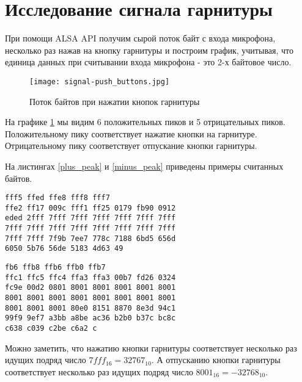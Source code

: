 \section{Исследование сигнала гарнитуры}

При помощи ALSA API получим сырой поток байт с входа микрофона, несколько раз нажав на кнопку гарнитуры и построим график, учитывая, что единица данных при считывании входа микрофона - это 2-х байтовое число. 

\begin{figure}[h]
  \centering
  \texttt{[image: signal-push\_buttons.jpg]}
  \caption{Поток байтов при нажатии кнопок гарнитуры}
  \label{image:signal}
\end{figure}

На графике \ref{image:signal} мы видим 6 положительных пиков и 5 отрицательных пиков. Положительному пику соответствует нажатие кнопки на гарнитуре. Отрицательному пику соответствует отпускание кнопки гарнитуры.

На листингах \ref{plus_peak} и \ref{minus_peak} приведены примеры считанных байтов.

\begin{lstlisting}[caption={Положительный пик (в шестнадцатиричной системе)},label=plus_peak]
fff5 ffed ffe8 fff8 fff7
ffe2 ff17 009c fff1 ff25 0179 fb90 0912
eded 2fff 7fff 7fff 7fff 7fff 7fff 7fff
7fff 7fff 7fff 7fff 7fff 7fff 7fff 7fff
7fff 7fff 7f9b 7ee7 778c 7188 6bd5 656d
6050 5b76 56de 5183 4d63 49
\end{lstlisting}


\begin{lstlisting}[caption={Отрицательный пик (в шестнадцатиричной системе)},label=minus_peak]
fb6 ffb8 ffb6 ffb0 ffb7
ffc1 ffc5 ffc4 ffa3 ffa3 00b7 fd26 0324
fc9e 00d2 0801 8001 8001 8001 8001 8001
8001 8001 8001 8001 8001 8001 8001 8001
8001 8001 8001 80e0 8151 8870 8e3d 94c1
99f9 9ef7 a3bb a8be ac36 b2b0 b37c bc8c
c638 c039 c2be c6a2 c
\end{lstlisting}

Можно заметить, что нажатию кнопки гарнитуры соответствует несколько раз идущих подряд число $7fff_{16} = 32767_{10}$. А отпусканию кнопки гарнитуры соответствует несколько раз идущих подряд число $8001_{16} = -32768_{10}$.
